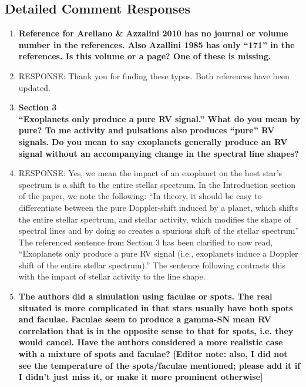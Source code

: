 \documentclass[11pt]{article}   	%
\begin{document}
\bigskip


\subsection{Detailed Comment Responses}

\begin{enumerate}
\item {\bf Reference for Arellano \& Azzalini 2010 has no journal or volume number in the references. Also Azallini 1985 has only ``171'' in the references. Is this volume or a page? One of these is missing.}
%
\item[]  RESPONSE:  Thank you for finding these typos.  Both references have been updated.
\bigskip
%
%
\item {\bf Section 3 \\
``Exoplanets only produce a pure RV signal.'' What do you mean by pure? To me activity and pulsations also produces ``pure'' RV signals. Do you mean to say exoplanets generally produce an RV signal without an accompanying change in the spectral line shapes?}
%
\item[]  RESPONSE:  Yes, we mean the impact of an exoplanet on the host star's spectrum is a shift to the entire stellar spectrum.  In the Introduction section of the paper, we note the following:  ``In theory, it should be easy to differentiate between the pure Doppler-shift induced by a planet, which shifts the entire stellar spectrum, and stellar activity, which modifies the shape of spectral lines and by doing so creates a spurious shift of the stellar spectrum''  The referenced sentence from Section 3 has been clarified to now read, ``Exoplanets only produce a pure RV signal (i.e., exoplanets induce a Doppler shift of the entire stellar spectrum).''  The sentence following contrasts this with the impact of stellar activity to the line shape.
\bigskip
%
%
\item {\bf The authors did a simulation using faculae or spots. The real situated is more complicated in that stars usually have both spots and faculae. Faculae seem to produce a gamma-SN mean RV correlation that is in the opposite sense to that for spots, i.e. they would cancel. Have the authors considered a more realistic case with a mixture of spots and faculae? [Editor note: also, I did not see the temperature of the spots/faculae mentioned; please add it if I didn't just miss it, or make it more prominent otherwise]}
%

\end{enumerate}
\end{document}
